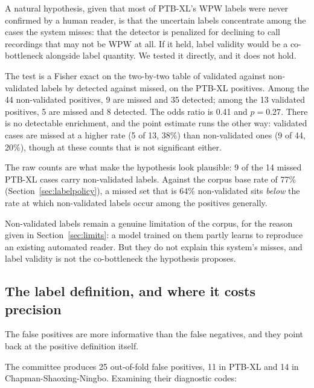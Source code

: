 \documentclass[11pt]{article}
\begin{document}
A natural hypothesis, given that most of PTB-XL's WPW labels were never confirmed by a human reader, is that the uncertain labels concentrate among the cases the system misses: that the detector is penalized for declining to call recordings that may not be WPW at all. If it held, label validity would be a co-bottleneck alongside label quantity. We tested it directly, and it does not hold.

The test is a Fisher exact on the two-by-two table of validated against non-validated labels by detected against missed, on the PTB-XL positives. Among the 44 non-validated positives, 9 are missed and 35 detected; among the 13 validated positives, 5 are missed and 8 detected. The odds ratio is 0.41 and $p = 0.27$. There is no detectable enrichment, and the point estimate runs the other way: validated cases are missed at a higher rate (5 of 13, 38\%) than non-validated ones (9 of 44, 20\%), though at these counts that is not significant either.

The raw counts are what make the hypothesis look plausible: 9 of the 14 missed PTB-XL cases carry non-validated labels. Against the corpus base rate of 77\% (Section~\ref{sec:labelpolicy}), a missed set that is 64\% non-validated sits \emph{below} the rate at which non-validated labels occur among the positives generally.

Non-validated labels remain a genuine limitation of the corpus, for the reason given in Section~\ref{sec:limits}: a model trained on them partly learns to reproduce an existing automated reader. But they do not explain this system's misses, and label validity is not the co-bottleneck the hypothesis proposes.

\subsection{The label definition, and where it costs precision}
\label{sec:fp}

The false positives are more informative than the false negatives, and they point back at the positive definition itself.

The committee produces 25 out-of-fold false positives, 11 in PTB-XL and 14 in Chapman-Shaoxing-Ningbo. Examining their diagnostic codes:
\end{document}

